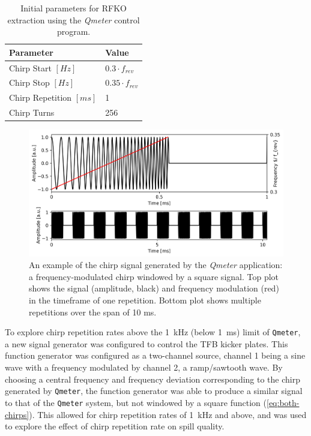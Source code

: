 \documentclass[a4paper,twoside,11pt]{report}
\begin{document}
\begin{table}[]
  \centering
  \begin{tabular}{ll}
    \centering
  Parameter                 & Value                  \\ \hline \hline
  Chirp Start $[Hz]$        & $0.3\cdot f_{rev}$     \\
  Chirp Stop $[Hz]$         & $0.35\cdot f_{rev}$    \\
  Chirp Repetition $[ms]$   & 1                      \\
  Chirp Turns               & 256                   
  \end{tabular}
  \caption[Initial \textit{Qmeter} parameters]{Initial parameters for RFKO extraction using the \textit{Qmeter} control program.}\label{tab:qmeter-params}
\end{table}

\begin{figure}
  \centering
  \includegraphics[width=0.6\linewidth]{fake-signal.png}
  \caption[Example chirp signals generated by \textit{Qmeter}]{An example of the chirp signal generated by the \textit{Qmeter} application: a frequency-modulated chirp windowed by a square signal. Top plot shows the signal (amplitude, black) and frequency modulation (red) in the timeframe of one repetition. Bottom plot shows multiple repetitions over the span of 10 ms.}\label{fig:qmeter-signal}
\end{figure}

To explore chirp repetition rates above the \qty{1}{\kilo\hertz} (below \qty{1}{\milli\second}) limit of \verb|Qmeter|, a new signal generator was configured to control the TFB kicker plates. This function generator was configured as a two-channel source, channel 1 being a sine wave with a frequency modulated by channel 2, a ramp/sawtooth wave. By choosing a central frequency and frequency deviation corresponding to the chirp generated by \verb|Qmeter|, the function generator was able to produce a similar signal to that of the \verb|Qmeter| system, but not windowed by a square function (\autoref{eq:both-chirps}). This allowed for chirp repetition rates of \qty{1}{\kilo\hertz} and above, and was used to explore the effect of chirp repetition rate on spill quality.
\end{document}

